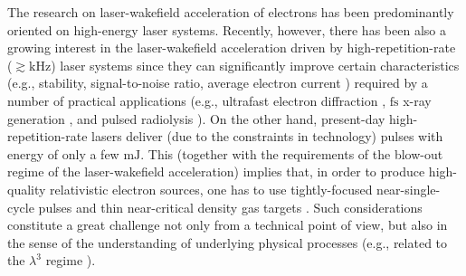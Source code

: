 \documentclass[10pt, a4paper, twoside, openright]{report}
\begin{document}

The research on laser-wakefield acceleration of electrons has been predominantly oriented on high-energy laser systems. Recently, however, there has been also a growing interest in the laser-wakefield acceleration driven by high-repetition-rate ($ \gtrsim \mathrm{kHz} $) laser systems since they can significantly improve certain characteristics (e.g., stability, signal-to-noise ratio, average electron current \cite{Faure2018}) required by a number of practical applications (e.g., ultrafast electron diffraction \cite{Sciaini2011, Miller2014}, $ \mathrm{fs} $ x-ray generation \cite{TaPhuoc2012, Corde2013}, and pulsed radiolysis \cite{Muroya2008}). On the other hand, present-day high-repetition-rate lasers deliver (due to the constraints in technology) pulses with energy of only a few $ \mathrm{mJ} $. This (together with the requirements of the blow-out regime of the laser-wakefield acceleration) implies that, in order to produce high-quality relativistic electron sources, one has to use tightly-focused near-single-cycle pulses and thin near-critical density gas targets \cite{Faure2018, Salehi2019}. Such considerations constitute a great challenge not only from a technical point of view, but also in the sense of the understanding of underlying physical processes (e.g., related to the $ \lambda^{3} $ regime \cite{Mourou2002, Naumova2004}).
\end{document}
